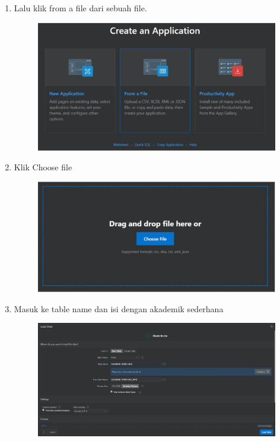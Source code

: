 \begin{enumerate}
\item Lalu klik from a file dari sebuah file.
       \begin{figure}[!htbp]
    \centering
    \includegraphics[scale=0.5]{section/4.JPG}
    \label{gambar 1}
\end{figure}
\item Klik Choose file
       \begin{figure}[!htbp]
    \centering
    \includegraphics[scale=0.4]{section/5.JPG}
    \label{gambar 1}
\end{figure}
\vspace{3cm}
\item Masuk ke table name dan isi dengan akademik sederhana
       \begin{figure}[!htbp]
    \centering
    \includegraphics[scale=0.4]{section/7.JPG}
    \label{gambar 1}
\end{figure}


\end{enumerate}
